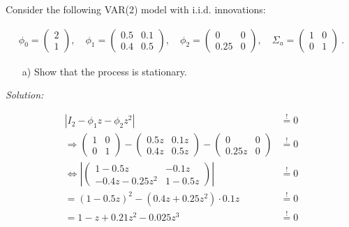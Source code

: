 \documentclass[12pt,a4paper]{article}
\begin{document}
Consider the following VAR(2) model with i.i.d. innovations:

\begin{align*}
    \phi_0 = \begin{pmatrix} 2 \\ 1 \end{pmatrix}, \quad \phi_1 = \begin{pmatrix} 0.5 & 0.1 \\ 0.4 & 0.5 \end{pmatrix}, \quad \phi_2 = \begin{pmatrix} 0 & 0 \\ 0.25 & 0 \end{pmatrix}, \quad \Sigma_a = \begin{pmatrix} 1 & 0 \\ 0 & 1 \end{pmatrix}
\ \text{.}
\end{align*}

\begin{itemize}
    \item[a)] Show that the process is stationary.
\end{itemize}

\emph{Solution:}

\begin{align*}
  \left| I_2 - \phi_1 z - \phi_2 z^2 \right| & \overset{!}{=} 0 \\
  \Rightarrow \begin{pmatrix} 1 & 0 \\ 
  0 & 1 \end{pmatrix} - \begin{pmatrix}  0.5 z & 0.1 z \\
  0.4 z & 0.5 z
  \end{pmatrix} - 
  \begin{pmatrix}  0 & 0 \\
  0.25 z & 0
  \end{pmatrix} & \overset{!}{=} 0\\
  \Leftrightarrow
  \left|
    \begin{pmatrix}  1- 0.5 z & -0.1 z \\
      -0.4 z - 0.25z^2 & 1- 0.5z
  \end{pmatrix}
  \right| & \overset{!}{=} 0\\
  = (1 - 0.5 z)^2 - (0.4z + 0.25z^2) \cdot 0.1z  & \overset{!}{=} 0 \\
  = 1 - z + 0.21 z^2 -0.025 z^3 & \overset{!}{=} 0
\end{align*}
\end{document}
